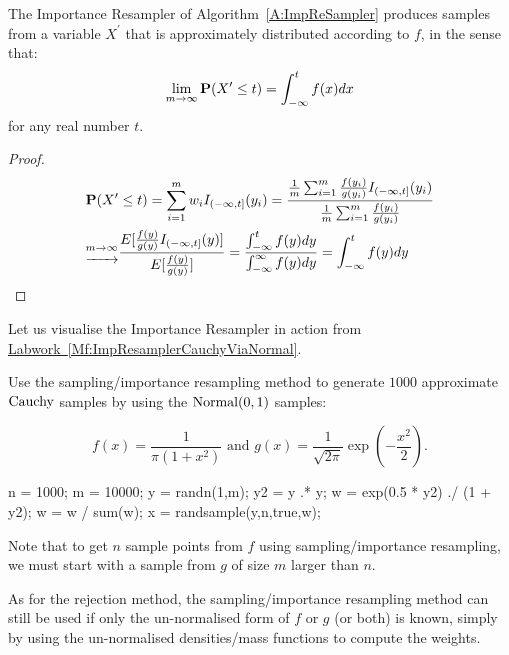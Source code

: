 {\begin{prop}The Importance Resampler of Algorithm~\ref{A:ImpReSampler} produces samples from a variable $X^{\prime}$ that is approximately distributed according to $f$, in the sense that:
\begin{equation}
\lim_{m\rightarrow \infty}\mathbf{P}( X^{\prime} \leq t)=\int^t_{-\infty}f(x)dx
\end{equation}
for any real number $t$.
\begin{proof}
\begin{displaymath}
\begin{split}
&\mathbf{P}(X^{\prime}\leq t)=\sum^m_{i=1}w_iI_{(-\infty,t]}(y_i)=\frac{\frac{1}{m}\sum^m_{i=1}\frac{f(y_i)}{g(y_i)}I_{(-\infty,t]}(y_i)}{\frac{1}{m}\sum^m_{i=1}\frac{f(y_i)}{g(y_i)}}\\
&\underrightarrow{^{m\rightarrow\infty}}\frac{E [\frac{f(y)}{g(y)}I_{(-\infty,t]}(y)]}{E[\frac{f(y)}{g(y)}]}=\frac{\int^t_{-\infty}f(y)dy}{{\int^{\infty}_{-\infty}f(y)dy}}=\int^t_{-\infty}f(y)dy\\
\end{split}
\end{displaymath}
\end{proof}
\end{prop}

Let us visualise the Importance Resampler in action from \hyperref[Mf:ImpResamplerCauchyViaNormal]{Labwork~\ref*{Mf:ImpResamplerCauchyViaNormal}}.

\begin{labwork}
Use the sampling/importance resampling method to generate $1000$ approximate $\mbox{{\rm Cauchy}}$ samples  by using the $\mbox{{\rm Normal}}(0,1)$ samples:

$$f(x)=\frac{1}{\pi(1+x^2)} \textrm{ and  } g(x)=\frac{1}{\sqrt{2\pi}}\exp\left(-\frac{x^2}{2}\right).$$

\begin{VrbM}
n = 1000;
m = 10000;
y = randn(1,m); %
y2 = y .* y;
w = exp(0.5 * y2) ./ (1 + y2);
w = w / sum(w);
x = randsample(y,n,true,w); %
\end{VrbM}
\end{labwork}

Note that to get $n$ sample points from $f$ using sampling/importance resampling, we must start with a sample from $g$ of size $m$ larger than $n$.

As for the rejection method, the sampling/importance resampling method can still be used if only the un-normalised form of $f$ or $g$ (or both) is known, simply by using the un-normalised densities/mass functions to compute the weights.
}


